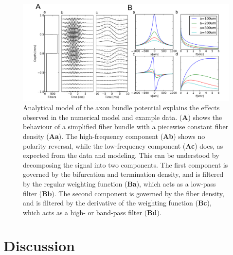\documentclass[]{article}
\begin{document}
\begin{figure}[htbp]
\centering
\includegraphics{../figs/mockups/fig5.pdf}
\caption{\label{fig:anamodel}Analytical model of the axon bundle
potential explains the effects observed in the numerical model and
example data. (\textbf{A}) shows the behaviour of a simplified fiber
bundle with a piecewise constant fiber density (\textbf{Aa}). The
high-frequency component (\textbf{Ab}) shows no polarity reversal, while
the low-frequency component (\textbf{Ac}) does, as expected from the
data and modeling. This can be understood by decomposing the signal into
two components. The first component is governed by the bifurcation and
termination density, and is filtered by the regular weighting function
(\textbf{Ba}), which acts as a low-pass filter (\textbf{Bb}). The second
component is governed by the fiber density, and is filtered by the
derivative of the weighting function (\textbf{Bc}), which acts as a
high- or band-pass filter (\textbf{Bd}).}
\end{figure}

\section{Discussion}\label{discussion}
\end{document}
